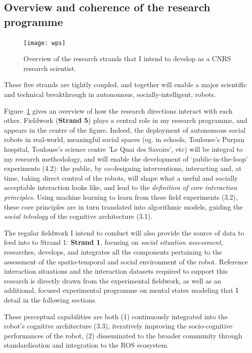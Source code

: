 \subsection{Overview and coherence of the research programme}

\begin{figure}[h!]
\centering
\texttt{[image: wps]}
\caption{Overview of the research strands that I intend to develop as a CNRS
    research scientist.}
\label{fig:wps}
\end{figure}

These five strands are tightly coupled, and together will enable a major
scientific and technical breakthrough in autonomous, socially-intelligent,
robots.

Figure~\ref{fig:wps} gives an overview of how the research directions interact
with each other. Fieldwork (\textbf{Strand 5}) plays a central role in my research programme, and
appears in the centre of the figure. Indeed, the deployment of autonomous social
robots in real-world, meaningful social spaces (eg. in schools, Toulouse's
Purpan hospital, Toulouse's science centre 'Le Quai des Savoirs', etc) will be
integral to my research methodology, and will enable the development of
`public-in-the-loop' experiments (4.2): the public, by co-designing interventions,
interacting and, at time, taking direct control of the robots, will shape what a
useful and socially acceptable interaction looks like, and lead to the
\emph{definition of core interaction principles}. Using machine learning to learn from
these field experiments (3.2), these core principles are in turn translated into
algorithmic models, guiding the \emph{social teleology} of the cognitive architecture
(3.1).

The regular fieldwork I intend to conduct will also provide the source of data
to feed into to Strand 1: \textbf{Strand 1}, focusing on \emph{social situation
assessment}, researches, develops, and integrates all the components pertaining
to the assessment of the spatio-temporal and social environment of the robot.
Reference interaction situations and the interaction datasets required to
support this research is directly drawn from the experimental fieldwork, as well
as an additional, focused experimental programme on mental states modeling that
I detail in the following sections.

These perceptual capabilities are both (1) continuously integrated into the
robot's cognitive architecture (3.3), iteratively improving the socio-cognitive
performances of the robot, (2) disseminated to the broader community through
standardisation and integration to the ROS ecosystem.

